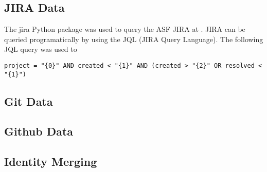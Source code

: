 \subsection{JIRA Data}
The jira Python package was used to query the ASF JIRA at \ASFJIRAURL. JIRA can be queried programatically by using the JQL (JIRA Query Language). The following JQL query was used to 
\begin{verbatim}
project = "{0}" AND created < "{1}" AND (created > "{2}" OR resolved < "{1}")
\end{verbatim}
\subsection{Git Data}
\subsection{Github Data}
\subsection{Identity Merging}
